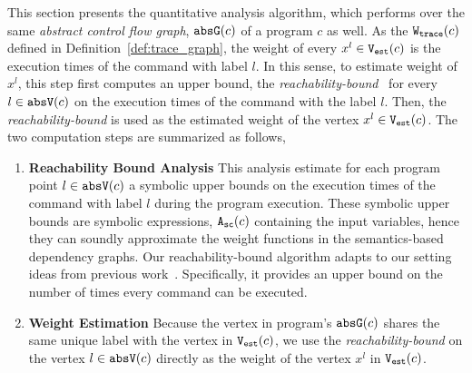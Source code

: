 This section presents the quantitative analysis algorithm, which performs over the same \emph{abstract control flow graph}, $\mathtt{abs}{\mathtt{G}}(c)$ of a program $c$ as well. 
As the $\mathtt{{W_{trace}}}(c)$ defined in Definition~\ref{def:trace_graph}, the weight of every $x^l \in \mathtt{{V_{est}}}(c)$ is
the execution times of the command with label $l$. 
In this sense, to estimate weight of $x^l$, this step first computes an upper bound, the \emph{reachability-bound}~\cite{GulwaniZ10} for every $l \in \mathtt{abs}{\mathtt{V}}(c)$
on the execution times of the command with the label $l$. 
Then, the \emph{reachability-bound} is used 
as the estimated weight of the vertex $x^l \in \mathtt{{V_{est}}}(c)$.
The two computation steps are summarized as follows,
\begin{enumerate}
 \item \textbf{Reachability Bound Analysis}
 This analysis estimate for each program point $l \in \mathtt{abs}{\mathtt{V}}(c)$ a symbolic upper bounds on the execution times of the command with label $l$ during the program execution.
 These symbolic upper bounds are symbolic expressions, ${\mathtt{A_{sc}}}(c)$ containing the input variables,
hence they can soundly approximate the weight functions in the semantics-based dependency graphs. 
 Our reachability-bound algorithm adapts to our setting ideas from previous work~\cite{ZulegerGSV11,SinnZV14,SinnZV17}.
 Specifically, it provides an upper bound on the number of times every command can be executed.
 \item \textbf{Weight Estimation}
 Because
 the vertex in program's $\mathtt{abs}{\mathtt{G}}(c)$ shares the same unique label with the vertex in $\mathtt{{V_{est}}}(c)$, 
 we use the \emph{reachability-bound} on the vertex $l \in \mathtt{abs}{\mathtt{V}}(c)$ directly as the weight of the vertex $x^l$ in $\mathtt{{V_{est}}}(c)$.
\end{enumerate}


